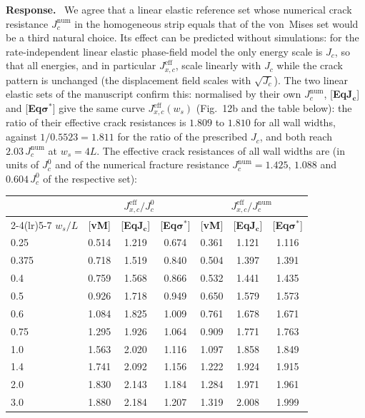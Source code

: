 \documentclass[pdflatex,sn-mathphys-num]{sn-jnl}
\newcommand{\vMLabel}{[\textbf{vM}]\xspace}
\newcommand{\EqJcLabel}{[\textbf{Eq$\boldsymbol{J_c}$}]\xspace}
\newcommand{\EqSigmaStarLabel}{[\textbf{Eq$\boldsymbol{\sigma^*}$}]\xspace}
\newenvironment{response}
  {\par\noindent\textbf{Response.}\ }
  {\par}
\begin{document}
\begin{response}
We agree that a linear elastic reference set whose numerical crack resistance $J_c^{\mathrm{num}}$ in the homogeneous
strip equals that of the von~Mises set would be a third natural choice. Its effect can be predicted without
simulations: for the rate-independent linear elastic phase-field model the only energy scale is $J_c$, so that all
energies, and in particular $J_{x,c}^{\text{eff}}$, scale linearly with $J_c$ while the crack pattern is unchanged (the
displacement field scales with $\sqrt{J_c}$). The two linear elastic sets of the manuscript confirm this: normalised by
their own $J_c^{\mathrm{num}}$, \EqJcLabel and \EqSigmaStarLabel give the same curve $J_{x,c}^{\text{eff}}(w_s)$
(Fig.~12b and the table below): the ratio of their effective crack resistances is $1.809$ to $1.810$ for all wall widths,
against $1/0.5523 = 1.811$ for the ratio of the prescribed $J_c$, and both reach $2.03\,J_c^{\mathrm{num}}$ at
$w_s = 4L$. The effective crack resistances of all wall widths are (in units of $J_c^0$ and of the numerical fracture
resistance $J_c^{\mathrm{num}} = 1.425$, $1.088$ and $0.604\,J_c^0$ of the respective set):
\begin{center}\small
\begin{tabular}{lcccccc}
\toprule
 & \multicolumn{3}{c}{$J_{x,c}^{\text{eff}}/J_c^0$} & \multicolumn{3}{c}{$J_{x,c}^{\text{eff}}/J_c^{\text{num}}$} \\
\cmidrule(lr){2-4}\cmidrule(lr){5-7}
$w_s/L$ & \vMLabel & \EqJcLabel & \EqSigmaStarLabel & \vMLabel & \EqJcLabel & \EqSigmaStarLabel \\
\midrule
0.25  & 0.514 & 1.219 & 0.674 & 0.361 & 1.121 & 1.116 \\
0.375 & 0.718 & 1.519 & 0.840 & 0.504 & 1.397 & 1.391 \\
0.4   & 0.759 & 1.568 & 0.866 & 0.532 & 1.441 & 1.435 \\
0.5   & 0.926 & 1.718 & 0.949 & 0.650 & 1.579 & 1.573 \\
0.6   & 1.084 & 1.825 & 1.009 & 0.761 & 1.678 & 1.671 \\
0.75  & 1.295 & 1.926 & 1.064 & 0.909 & 1.771 & 1.763 \\
1.0   & 1.563 & 2.020 & 1.116 & 1.097 & 1.858 & 1.849 \\
1.4   & 1.741 & 2.092 & 1.156 & 1.222 & 1.924 & 1.915 \\
2.0   & 1.830 & 2.143 & 1.184 & 1.284 & 1.971 & 1.961 \\
3.0   & 1.880 & 2.184 & 1.207 & 1.319 & 2.008 & 1.999 \\

\end{tabular}
\end{center}
\end{response}
\end{document}
